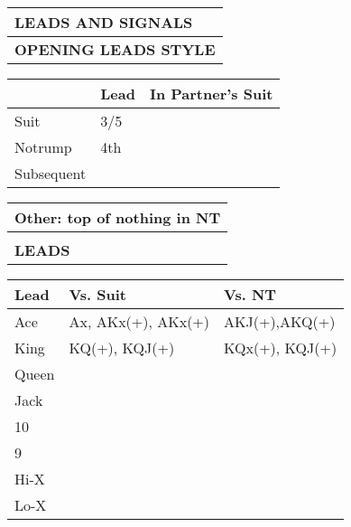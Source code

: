 \documentclass{article}
\begin{document}
\begin{minipage}{5mm}
	\begin{tabular}{| p{5mm} |}
	\end{tabular}
\end{minipage}
\begin{minipage}{90mm}
	\begin{tabular}{| p{88mm} |}
		\hline
		\cellcolor[gray]{0.9} \textbf{LEADS AND SIGNALS} \\ \hline
		\textbf{OPENING LEADS STYLE} \\ \hline
	\end{tabular}
	\begin{tabular}{| p{15.25mm} | p{32mm} | p{32mm} |}
		& Lead & In Partner's Suit \\ \hline
		Suit       &3/5 & \\ \hline
		Notrump    &4th & \\ \hline
		Subsequent & & \\ \hline
	\end{tabular}
	\begin{tabular}{| p{88mm} |}
		Other: top of nothing in NT \\ \hline
		\\ \hline
		\textbf{LEADS} \\ \hline
	\end{tabular}
	\begin{tabular}{| p{15.25mm} | p{32mm} | p{32mm} |}
		Lead & Vs. Suit & Vs. NT \\ \hline
                Ace &Ax, AKx(+), AKx(+) & AKJ(+),AKQ(+) \\ \hline
                King &KQ(+), KQJ(+) &KQx(+), KQJ(+) \\ \hline
		Queen & & \\ \hline
		Jack & & \\ \hline
		10 & & \\ \hline
		9 & & \\ \hline
		Hi-X &  & \\ \hline
		Lo-X & & \\ \hline
	\end{tabular}
	\begin{tabular}{| p{88mm} |}


\end{tabular}
\end{minipage}
\end{document}
